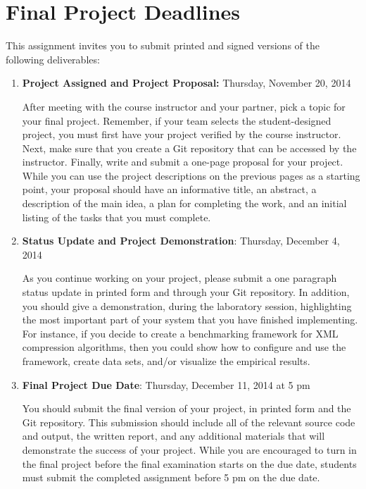 \section*{Final Project Deadlines}

This assignment invites you to submit printed and signed versions of the following deliverables: 

\vspace*{-.05in}
\begin{enumerate}

  \itemsep0in

  \item {\bf Project Assigned and Project Proposal:} Thursday, November 20, 2014

    After meeting with the course instructor and your partner, pick a topic for your final project.  Remember, if your
    team selects the student-designed project, you must first have your project verified by the course instructor.  Next, make
    sure that you create a Git repository that can be accessed by the instructor. Finally, write and submit a one-page
    proposal for your project. While you can use the project descriptions on the previous pages as a starting point,
    your proposal should have an informative title, an abstract, a description of the main idea, a plan for completing
    the work, and an initial listing of the tasks that you must complete.

  \item {\bf Status Update and Project Demonstration}: Thursday, December 4, 2014

    As you continue working on your project, please submit a one paragraph status update in printed form and through
    your Git repository.  In addition, you should give a demonstration, during the laboratory session, highlighting the
    most important part of your system that you have finished implementing. For instance, if you decide to create a
    benchmarking framework for XML compression algorithms, then you could show how to configure and use the framework,
    create data sets, and/or visualize the empirical results.

  \item {\bf Final Project Due Date}: Thursday, December 11, 2014 at 5 pm

    You should submit the final version of your project, in printed form and the Git repository. This submission should
    include all of the relevant source code and output, the written report, and any additional materials that will
    demonstrate the success of your project.  While you are encouraged to turn in the final project before the final
    examination starts on the due date, students must submit the completed assignment before 5 pm on the due date.

\end{enumerate}
\vspace*{-.05in}

